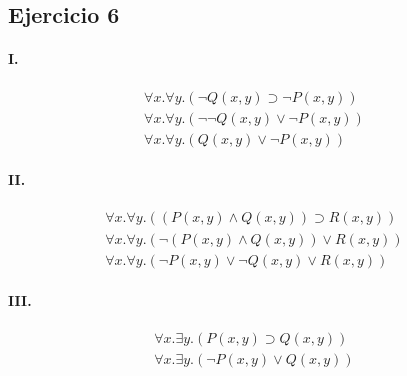 \documentclass[10pt,a4paper]{article}
\begin{document}
\subsection{Ejercicio 6}
\begin{multicols}{2}
\paragraph{I.}
\begin{align*}
\forall x.  \forall y. ( \lnot Q(x,y) \supset \lnot P(x,y))& \\[1pt]
\forall x.  \forall y. ( \lnot \lnot Q(x,y) \lor \lnot P(x,y))& \\[1pt]
\forall x.  \forall y. ( Q(x,y) \lor \lnot P(x,y))&
\end{align*}


\paragraph{II.}
\begin{align*}
\forall x.  \forall y. ((P(x,y) \land Q(x,y)) \supset R(x,y))& \\[1pt]
\forall x.  \forall y. (\lnot (P(x,y) \land Q(x,y)) \lor R(x,y))& \\[1pt]
\forall x.  \forall y. (\lnot P(x,y) \lor \lnot Q(x,y) \lor R(x,y))&
\end{align*}
\vfill\null
\columnbreak
\paragraph{III.}
\begin{align*}
\forall x.  \exists y. (P(x,y) \supset Q(x,y))& \\[1pt]
\forall x.  \exists y. (\lnot P(x,y) \lor Q(x,y))&
\end{align*}

\end{multicols}
\end{document}
